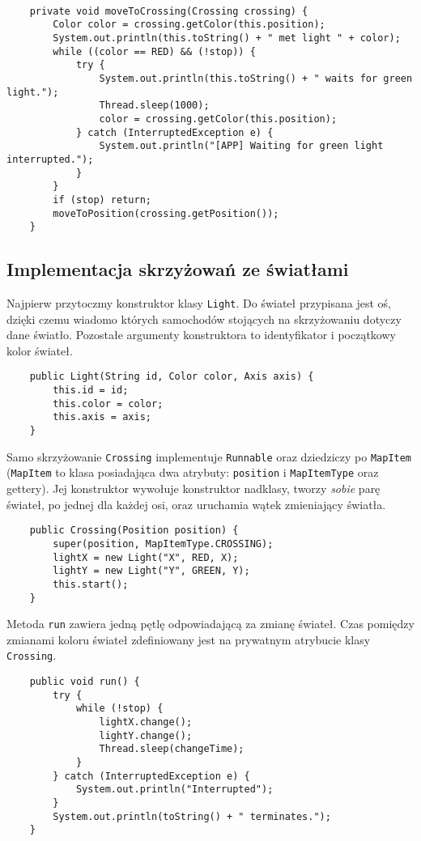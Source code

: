 \documentclass[a4paper]{article}
\begin{document}
\begin{verbatim}

    private void moveToCrossing(Crossing crossing) {
        Color color = crossing.getColor(this.position);
        System.out.println(this.toString() + " met light " + color);
        while ((color == RED) && (!stop)) {
            try {
                System.out.println(this.toString() + " waits for green light.");
                Thread.sleep(1000);
                color = crossing.getColor(this.position);
            } catch (InterruptedException e) {
                System.out.println("[APP] Waiting for green light interrupted.");
            }
        }
        if (stop) return;
        moveToPosition(crossing.getPosition());
    }
\end{verbatim}

\subsection{Implementacja skrzyżowań ze światłami}
Najpierw przytoczmy konstruktor klasy \verb+Light+. Do świateł przypisana jest oś, dzięki czemu wiadomo których samochodów stojących na skrzyżowaniu dotyczy dane światło. Pozostałe argumenty konstruktora to identyfikator i początkowy kolor świateł.
\begin{verbatim}
    public Light(String id, Color color, Axis axis) {
        this.id = id;
        this.color = color;
        this.axis = axis;
    }
\end{verbatim}
Samo skrzyżowanie \verb+Crossing+ implementuje \verb+Runnable+ oraz dziedziczy po \verb+MapItem+ (\verb+MapItem+ to klasa posiadająca dwa atrybuty: \verb+position+ i \verb+MapItemType+ oraz gettery). Jej konstruktor wywołuje konstruktor nadklasy, tworzy \textit{sobie} parę świateł, po jednej dla każdej osi, oraz uruchamia wątek zmieniający światła. 
\begin{verbatim}
    public Crossing(Position position) {
        super(position, MapItemType.CROSSING);
        lightX = new Light("X", RED, X);
        lightY = new Light("Y", GREEN, Y);
        this.start();
    }
\end{verbatim}
Metoda \verb+run+ zawiera jedną pętlę odpowiadającą za zmianę świateł. Czas pomiędzy zmianami koloru świateł zdefiniowany jest na prywatnym atrybucie klasy \verb+Crossing+.
\begin{verbatim}
    public void run() {
        try {
            while (!stop) {
                lightX.change();
                lightY.change();
                Thread.sleep(changeTime);
            }
        } catch (InterruptedException e) {
            System.out.println("Interrupted");
        }
        System.out.println(toString() + " terminates.");
    }
\end{verbatim}
\end{document}
